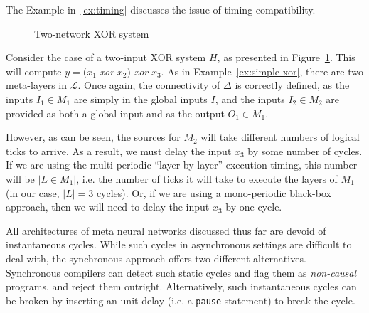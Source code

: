 
The Example in~\ref{ex:timing} discusses the issue of timing compatibility.

\begin{figure}
	\centering
	\scalebox{0.8}{}
	\caption{Two-network XOR system}
	\label{fig:two-xor}
\end{figure}

\begin{example}
	\label{ex:timing}
	Consider the case of a two-input XOR system $H$, as presented in Figure~\ref{fig:two-xor}.
	This will compute $y = \big(x_1$ \textit{xor} $x_2\big)$ \textit{xor} $x_3$.
	As in Example~\ref{ex:simple-xor}, there are two meta-layers in $\mathcal{L}$. 
	Once again, the connectivity of $\Delta$ is correctly defined, as the inputs $I_1 \in M_1$ are simply in the global inputs $I$, and the inputs $I_2 \in M_2$ are provided as both a global input and as the output $O_1 \in M_1$.  
	
	However, as can be seen, the sources for $M_2$ will take different numbers of logical ticks to arrive.
	As a result, we must delay the input $x_3$ by some number of cycles.
	If we are using the multi-periodic ``layer by layer'' execution timing, this number will be $|L \in M_1|$, i.e. the number of ticks it will take to execute the layers of $M_1$ (in our case, $|L| = 3$ cycles). 
	Or, if we are using a mono-periodic black-box approach, then we will need to delay the input $x_3$ by one cycle.
\end{example}

All architectures of meta neural networks discussed thus far are
devoid of instantaneous cycles. While such cycles in asynchronous settings are difficult
to deal with, the synchronous approach offers two different
alternatives. Synchronous compilers can detect such static cycles and flag
them as \emph{non-causal}~\cite{benveniste2003synchronous} programs, and reject them outright. Alternatively, such instantaneous cycles
can be broken by inserting an unit delay (i.e. a \texttt{pause}
statement) to break the cycle.

